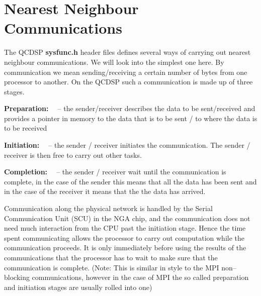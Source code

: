 \section{Nearest Neighbour Communications}
The QCDSP {\bf sysfunc.h} header files defines several ways of carrying
out nearest neighbour communications. We will look into the simplest one
here. By communication we mean sending/receiving a certain number of bytes
from one processor to another. On the QCDSP such a communication is made up of
three stages.
\begin{description}
\item{\bf Preparation: \ } -- the sender/receiver describes the data
to be sent/received and provides a pointer in memory to the data that
is to be sent / to where the data is to be received
\item{\bf Initiation: \ } --  the sender / receiver initiates the 
communication. The sender / receiver is then free to carry out other
tasks.
\item{\bf Completion: \ } -- the sender / receiver wait until the 
communication is complete, in the case of the sender this means that 
all the data has been sent and in the case of the receiver it means that
the the data has arrived.
\end{description}
Communication along the physical network is handled by the Serial
Communication Unit (SCU) in the NGA chip, and the communication does
not need much interaction from the CPU past the initiation
stage. Hence the time spent communicating allows the processor to
carry out computation while the communication proceeds. It is only
immediately before using the results of the communications that the
processor has to wait to make sure that the communication is
complete. (Note: This is similar in style to the MPI non--blocking
communications, however in the case of MPI the so called preparation
and initiation stages are usually rolled into one)


